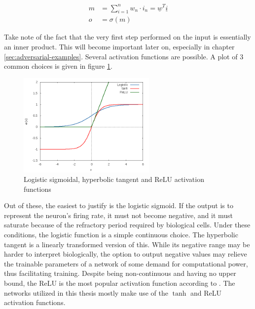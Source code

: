 \documentclass[11pt, a4paper]{article}
\newcommand\braces[1]{\left(#1\right)}
\renewcommand{\vec}[1]{\underline{#1}}
\begin{document}
\begin{align}
	m &= \sum_{i=1}^n w_n \cdot i_n = \vec{w}^T \vec{i} \label{eq:neuron-math-membrane-potential} \\
	o &= \sigma \braces{m} \label{eq:neuron-math-activation-function}
\end{align}



Take note of the fact that the very first step performed on the input is essentially an inner product. This will become important later on, especially in chapter \ref{sec:adversarial-examples}. Several activation functions are possible. A plot of 3 common choices is given in figure \ref{fig:activation-functions}.

\begin{figure}[htp]
	\centering
	\includegraphics[width=0.6\textwidth]{images/activation_functions.png}
	\caption{Logistic sigmoidal, hyperbolic tangent and ReLU activation functions}
	\label{fig:activation-functions}
\end{figure}

Out of these, the easiest to justify is the logistic sigmoid. If the output is to represent the neuron's firing rate, it must not become negative, and it must saturate because of the refractory period required by biological cells. Under these conditions, the logistic function is a simple continuous choice. The hyperbolic tangent is a linearly transformed version of this. While its negative range may be harder to interpret biologically, the option to output negative values may relieve the trainable parameters of a network of some demand for computational power, thus facilitating training. Despite being non-continuous and having no upper bound, the ReLU is the most popular activation function according to \cite{deep-learning}. The networks utilized in this thesis mostly make use of the $\tanh$ and ReLU activation functions.
\end{document}
